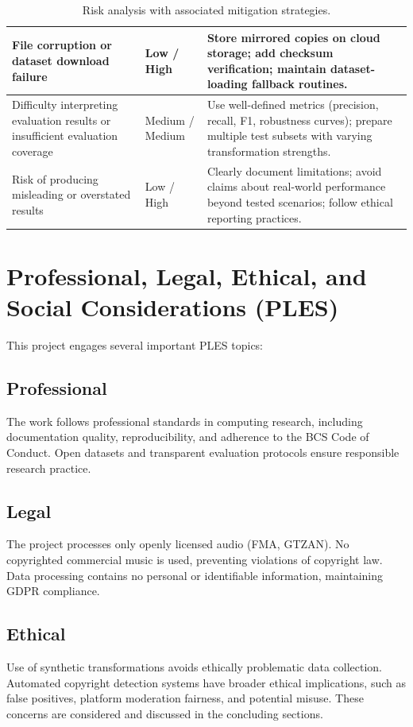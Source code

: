 \begin{table}[h!]
\begin{tabular}{|p{4cm}|p{3cm}|p{7cm}|}
\hline
File corruption or dataset download failure 
& Low / High 
& Store mirrored copies on cloud storage; add checksum verification; maintain dataset-loading fallback routines. \\
\hline
Difficulty interpreting evaluation results or insufficient evaluation coverage 
& Medium / Medium 
& Use well-defined metrics (precision, recall, F1, robustness curves); prepare multiple test subsets with varying transformation strengths. \\
\hline
Risk of producing misleading or overstated results 
& Low / High 
& Clearly document limitations; avoid claims about real-world performance beyond tested scenarios; follow ethical reporting practices. \\
\hline
\end{tabular}
\caption{Risk analysis with associated mitigation strategies.}
\end{table}

\section{Professional, Legal, Ethical, and Social Considerations (PLES)}
This project engages several important PLES topics:


\subsection*{Professional}
The work follows professional standards in computing research, including 
documentation quality, reproducibility, and adherence to the BCS Code of Conduct. 
Open datasets and transparent evaluation protocols ensure responsible research practice.

\subsection*{Legal}
The project processes only openly licensed audio (FMA, GTZAN). No copyrighted 
commercial music is used, preventing violations of copyright law. Data processing 
contains no personal or identifiable information, maintaining GDPR compliance.

\subsection*{Ethical}
Use of synthetic transformations avoids ethically problematic data collection.  
Automated copyright detection systems have broader ethical implications, such as 
false positives, platform moderation fairness, and potential misuse. These concerns 
are considered and discussed in the concluding sections.

